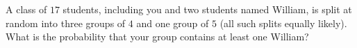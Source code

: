 A class of $17$ students, including you and two students named William, is split at random into three groups of $4$ and one group of $5$ (all such splits equally likely). What is the probability that your group contains at least one William?
